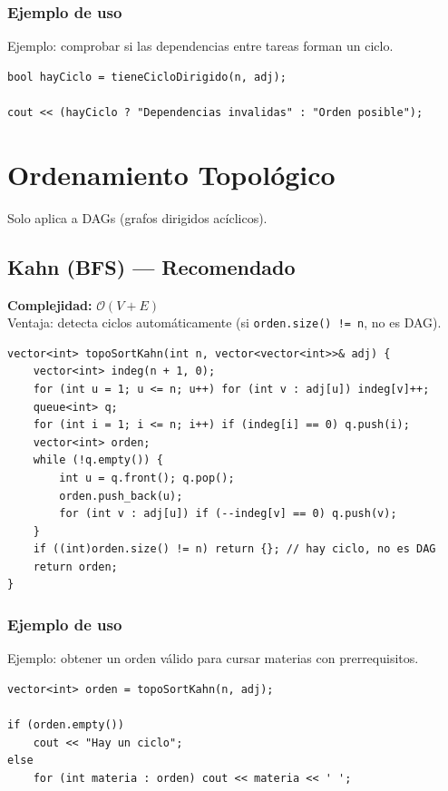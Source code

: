 \documentclass[10pt,twocolumn,letterpaper]{report}
\begin{document}
\subsubsection*{Ejemplo de uso}
Ejemplo: comprobar si las dependencias entre tareas forman un ciclo.
\begin{lstlisting}
bool hayCiclo = tieneCicloDirigido(n, adj);

cout << (hayCiclo ? "Dependencias invalidas" : "Orden posible");
\end{lstlisting}


\section{Ordenamiento Topológico}
Solo aplica a DAGs (grafos dirigidos acíclicos).

\subsection{Kahn (BFS) --- Recomendado}
\textbf{Complejidad:} $\mathcal{O}(V + E)$ \\
Ventaja: detecta ciclos automáticamente (si \texttt{orden.size() != n}, no es DAG).
\begin{lstlisting}
vector<int> topoSortKahn(int n, vector<vector<int>>& adj) {
    vector<int> indeg(n + 1, 0);
    for (int u = 1; u <= n; u++) for (int v : adj[u]) indeg[v]++;
    queue<int> q;
    for (int i = 1; i <= n; i++) if (indeg[i] == 0) q.push(i);
    vector<int> orden;
    while (!q.empty()) {
        int u = q.front(); q.pop();
        orden.push_back(u);
        for (int v : adj[u]) if (--indeg[v] == 0) q.push(v);
    }
    if ((int)orden.size() != n) return {}; // hay ciclo, no es DAG
    return orden;
}
\end{lstlisting}
\subsubsection*{Ejemplo de uso}
Ejemplo: obtener un orden válido para cursar materias con prerrequisitos.
\begin{lstlisting}
vector<int> orden = topoSortKahn(n, adj);

if (orden.empty())
    cout << "Hay un ciclo";
else
    for (int materia : orden) cout << materia << ' ';
\end{lstlisting}
\end{document}
